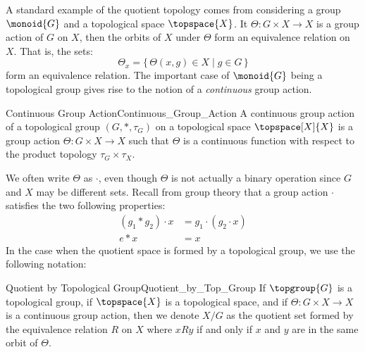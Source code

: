         A standard example of the quotient topology comes from considering
        a group $\monoid{G}$ and a topological space $\topspace{X}$. It
        $\Theta:G\times{X}\rightarrow{X}$ is a group action of $G$ on $X$, then
        the orbits of $X$ under $\Theta$ form an equivalence relation on $X$.
        That is, the sets:
        \begin{equation}
            \Theta_{x}=\{\,\Theta(x,g)\in{X}\;|\;g\in{G}\,\}
        \end{equation}
        form an equivalence relation. The important case of $\monoid{G}$ being a
        topological group gives rise to the notion of a \textit{continuous}
        group action.
        \begin{fdefinition}{Continuous Group Action}{Continuous_Group_Action}
            A continuous group action of a topological group $(G,*,\tau_{G})$ on
            a topological space $\topspace[X]{X}$ is a group action
            $\Theta:G\times{X}\rightarrow{X}$ such that $\Theta$ is
            a continuous function with respect to the product topology
            $\tau_{G}\times\tau_{X}$.
        \end{fdefinition}
        We often write $\Theta$ as $\cdot$, even though $\Theta$ is not actually
        a binary operation since $G$ and $X$ may be different sets. Recall from
        group theory that a group action $\cdot$ satisfies the two following
        properties:
        \begin{align}
            (g_{1}*{g}_{2})\cdot{x}&=g_{1}\cdot(g_{2}\cdot{x})\\
            e*x&=x
        \end{align}
        In the case when the quotient space is formed by a topological group, we
        use the following notation:
        \begin{fnotation}{Quotient by Topological Group}{Quotient_by_Top_Group}
            If $\topgroup{G}$ is a topological group, if $\topspace{X}$ is a
            topological space, and if $\Theta:G\times{X}\rightarrow{X}$ is a
            continuous group action, then we denote $X/G$ as the quotient set
            formed by the equivalence relation $R$ on $X$ where $xRy$ if and
            only if $x$ and $y$ are in the same orbit of $\Theta$.
        \end{fnotation}
